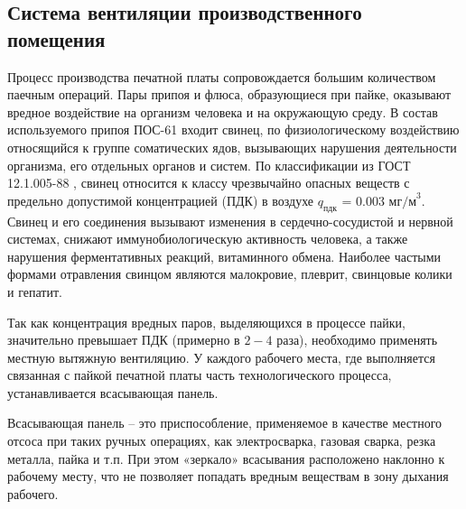 \clearpage
\subsection{Система вентиляции производственного помещения}
\label{vent_system_calculation}

Процесс производства печатной платы сопровождается большим количеством паечным
операций.
Пары припоя и флюса, образующиеся при пайке, оказывают вредное воздействие на
организм человека и на окружающую среду. В состав используемого припоя ПОС-61
входит свинец, по физиологическому воздействию относящийся к группе соматических
ядов, вызывающих нарушения деятельности организма, его отдельных органов и систем.
По классификации из ГОСТ 12.1.005-88 \cite{ecology_gost_005_88}, свинец относится
к классу чрезвычайно опасных веществ с предельно допустимой концентрацией (ПДК)
в воздухе $q_\text{пдк}$ = 0.003 $\text{мг/м}^3$.
Свинец и его соединения вызывают изменения в сердечно-сосудистой и нервной системах,
снижают иммунобиологическую активность человека, а также нарушения ферментативных
реакций, витаминного обмена. Наиболее частыми формами отравления свинцом являются
малокровие, плеврит, свинцовые колики и гепатит.

Так как концентрация вредных паров, выделяющихся в процессе пайки, значительно
превышает ПДК (примерно в $2 - 4$ раза), необходимо применять местную вытяжную вентиляцию.
У каждого рабочего места, где выполняется связанная с пайкой печатной платы часть
технологического процесса, устанавливается всасывающая панель.

Всасывающая панель – это приспособление, применяемое в качестве местного отсоса
при таких ручных операциях, как электросварка, газовая сварка, резка металла,
пайка и т.п. При этом «зеркало» всасывания расположено наклонно к рабочему месту,
что не позволяет попадать вредным веществам в зону дыхания рабочего.

